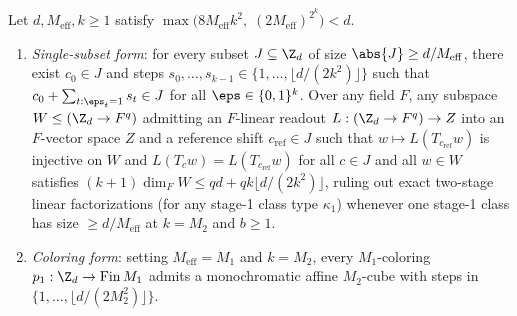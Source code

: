 \begin{lemma}\label{lem:cs-cube}
Let $d, M_{\mathrm{eff}}, k \ge 1$ satisfy $\max\bigl(8 M_{\mathrm{eff}} k^2,\;
(2 M_{\mathrm{eff}})^{2^k}\bigr) < d$.
\begin{enumerate}[label=(\alph*)]
\item \emph{Single-subset form}: for every subset $J \subseteq \Z_d$ of size $\abs{J} \ge
  d / M_{\mathrm{eff}}$, there exist $c_0 \in J$ and steps
  $s_0, \dots, s_{k-1} \in \{1, \dots, \lfloor d/(2k^2)\rfloor\}$ such that
  $c_0 + \sum_{t : \eps_t = 1} s_t \in J$ for all $\eps \in \{0,1\}^k$. Over any field $F$, any
  subspace $W \le (\Z_d \to F^q)$ admitting an $F$-linear readout $L : (\Z_d \to F^q) \to Z$ into an
  $F$-vector space $Z$ and a reference shift $c_{\mathrm{ref}} \in J$ such that
  $w \mapsto L(T_{c_{\mathrm{ref}}} w)$ is injective on $W$ and
  $L(T_c w) = L(T_{c_{\mathrm{ref}}} w)$ for all $c \in J$ and all $w \in W$ satisfies
  $(k + 1)\dim_F W \le q d + q k \lfloor d / (2 k^2)\rfloor$, ruling out exact two-stage linear
  factorizations (for any stage-1 class type $\kappa_1$) whenever one stage-1 class has size
  $\ge d / M_{\mathrm{eff}}$ at $k = M_2$ and $b \ge 1$.
\item \emph{Coloring form}: setting $M_{\mathrm{eff}} = M_1$ and $k = M_2$, every $M_1$-coloring
  $p_1 : \Z_d \to \mathrm{Fin}\,M_1$ admits a monochromatic affine $M_2$-cube with steps in
  $\{1, \dots, \lfloor d/(2 M_2^2)\rfloor\}$.
\end{enumerate}
\end{lemma}
